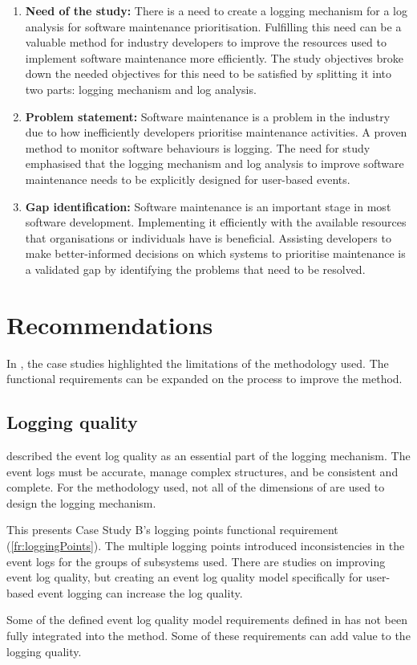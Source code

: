\begin{enumerate}[label=\textbf{\Roman*.}]
	\item \textbf{Need of the study:} There is a need to create a logging mechanism for a log analysis for software maintenance prioritisation. Fulfilling this need can be a valuable method for industry developers to improve the resources used to implement software maintenance more efficiently. The study objectives broke down the needed objectives for this need to be satisfied by splitting it into two parts: logging mechanism and log analysis. 
	\item \textbf{Problem statement:} Software maintenance is a problem in the industry due to how inefficiently developers prioritise maintenance activities. A proven method to monitor software behaviours is logging. The need for study emphasised that the logging mechanism and log analysis to improve software maintenance needs to be explicitly designed for user-based events.
	\item \textbf{Gap identification:} Software maintenance is an important stage in most software development. Implementing it efficiently with the available resources that organisations or individuals have is beneficial. Assisting developers to make better-informed decisions on which systems to prioritise maintenance is a validated gap by identifying the problems that need to be resolved.
\end{enumerate}

\section{Recommendations}
In , the case studies highlighted the limitations of the methodology used. The functional requirements can be expanded on the process to improve the method.

\subsection{Logging quality}
 described the event log quality as an essential part of the logging mechanism. The event logs must be accurate, manage complex structures, and be consistent and complete. For the methodology used, not all of the dimensions of  are used to design the logging mechanism.\par This presents Case Study B's logging points functional requirement (\ref{fr:loggingPoints}). The multiple logging points introduced inconsistencies in the event logs for the groups of subsystems used. There are studies on improving event log quality, but creating an event log quality model specifically for user-based event logging can increase the log quality. \par Some of the defined event log quality model requirements defined in  has not been fully integrated into the method. Some of these requirements can add value to the logging quality.


